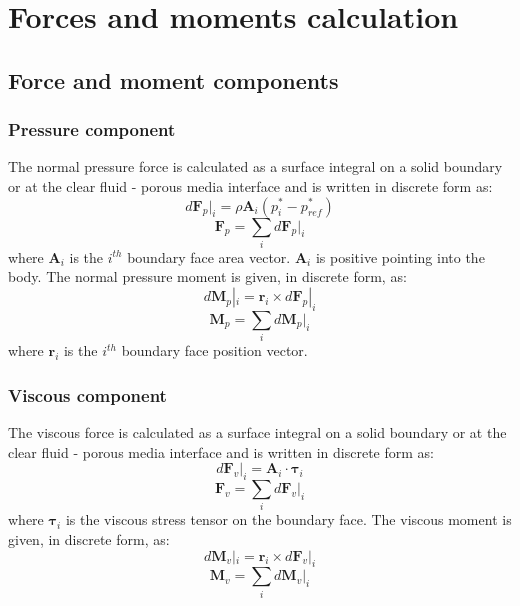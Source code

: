 \documentclass[a4paper,11pt]{report}
\begin{document}
\chapter{Forces and moments calculation}

\section{Force and moment components}

\subsection{Pressure component}
\label{subsec:pressure}

The normal pressure force is calculated as a surface integral on a solid boundary or at the clear fluid - porous media interface and is written in discrete form as:
\begin{equation}
    d\mathbf{F}_p|_i = \rho\mathbf{A}_i(p_i^*-p_{ref}^*)
    \label{eq:dFpi}
\end{equation}
\begin{equation}
    \mathbf{F}_p = \sum_i d\mathbf{F}_p|_i
    \label{eq:Fp}
\end{equation}
where $\mathbf{A}_i$ is the $i^{th}$ boundary face area vector. $\mathbf{A}_i$ is positive pointing into the body. The normal pressure moment is given, in discrete form, as:
\begin{equation}
    d\mathbf{M}_p|_i = \mathbf{r}_i\times d\mathbf{F}_p|_i
    \label{eq:dMpi}
\end{equation}
\begin{equation}
    \mathbf{M}_p = \sum_i d\mathbf{M}_p|_i
    \label{eq:Mp}
\end{equation}
where $\mathbf{r}_i$ is the $i^{th}$ boundary face position vector.

\subsection{Viscous component}
\label{subsec:viscous}

The viscous force is calculated as a surface integral on a solid boundary or at the clear fluid - porous media interface and is written in discrete form as:
\begin{equation}
    d\mathbf{F}_v|_i = \mathbf{A}_i\cdot \pmb{\tau}_i
    \label{eq:dFvi}
\end{equation}
\begin{equation}
    \mathbf{F}_v = \sum_i d\mathbf{F}_v|_i
    \label{eq:Fv}
\end{equation}
where $\pmb{\tau}_i$ is the viscous stress tensor on the boundary face. The viscous moment is given, in discrete form, as:
\begin{equation}
    d\mathbf{M}_v|_i = \mathbf{r}_i\times d\mathbf{F}_v|_i
    \label{eq:dMvi}
\end{equation}
\begin{equation}
    \mathbf{M}_v = \sum_i d\mathbf{M}_v|_i
    \label{eq:Mv}
\end{equation}
\end{document}
